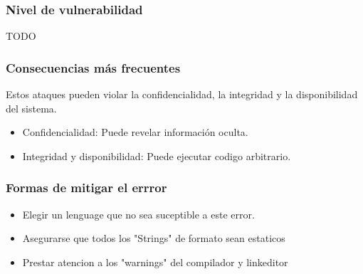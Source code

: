 \subsubsection{Nivel de vulnerabilidad}

TODO

\subsubsection{Consecuencias más frecuentes}

Estos ataques pueden violar la confidencialidad, la integridad y la disponibilidad del sistema.

\begin{itemize}
 \item Confidencialidad: Puede revelar información oculta.
 \item Integridad y disponibilidad: Puede ejecutar codigo arbitrario.
\end{itemize}

\subsubsection{Formas de mitigar el errror}

\begin{itemize}

	\item Elegir un lenguage que no sea suceptible a este error.

	\item Asegurarse que todos los "Strings" de formato sean estaticos

	\item Prestar atencion a los "warnings" del compilador y linkeditor

\end{itemize}
